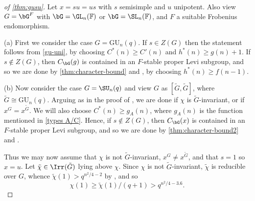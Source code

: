 \documentclass[eqthmnum,nocolour,skinny]{jt-calcs}
\newcommand{\GU}{\ensuremath{\mathrm{GU}}}
\begin{document}
\begin{proof}[of \cref{thm:gusu}]
Let $x = su = us$ with $s$ semisimple and $u$ unipotent. Also view $G = \bG^F$ with $\bG = \GL_n(\mathbb{F})$ or $\bG = \SL_n(\mathbb{F})$, and $F$ a suitable Frobenius 
endomorphism. 

(a) First we consider the case $G = \GU_n(q)$. If $s \in Z(G)$ then the statement follows from \cref{gu-uni}, by choosing
$C^*(n) \geq C'(n)$ and $h^*(n) \geq g(n)+1$. If $s \notin Z(G)$, then $C_{\bG}(g)$ is contained in an $F$-stable proper Levi subgroup, and
so we are done by  \cref{thm:character-bound} and \cite[Prop.~4.3]{bezrukavnikov-liebeck-shalev-tiep:2017:character-bounds-grps-Lie-type},
by choosing $h^*(n) \geq f(n-1)$.

(b) Now consider the case $G = \SU_n(q)$ and view $G$ as $[\tilde G,\tilde G]$, where $\tilde G \cong \GU_n(q)$. Arguing as in the proof of
\cite[Thm.~1.5]{bezrukavnikov-liebeck-shalev-tiep:2017:character-bounds-grps-Lie-type}, we are done if $\chi$ is $\tilde G$-invariant, or if 
$x^G = x^{\tilde G}$. We will also choose $C^*(n) \geq g_A(n)$, where $g_A(n)$ is the function mentioned in \cref{types A/C}. Hence, if $s \notin Z(G)$, then $C_{\bG}(x)$ is contained in an $F$-stable proper Levi subgroup, and
so we are done by  \cref{thm:character-bound2}
and \cite[Prop.~4.3]{bezrukavnikov-liebeck-shalev-tiep:2017:character-bounds-grps-Lie-type}.

Thus we may now assume that $\chi$ is not $\tilde G$-invariant, $x^G \neq x^{\tilde G}$, and that $s = 1$ so $x = u$. Let $\tilde\chi \in \Irr(\tilde G)$ lying above
$\chi$. Since $\chi$ is not $\tilde G$-invariant, $\tilde\chi$ is reducible over $G$, whence $\tilde\chi(1) > q^{n^2/4-2}$ by \cite[Thm.~3.4]{LBST}, and so
\begin{equation}\label{eq:deg-gu}
  \chi(1) \geq \tilde\chi(1)/(q+1) > q^{n^2/4-3.6}.
\end{equation}  


\end{proof}
\end{document}
